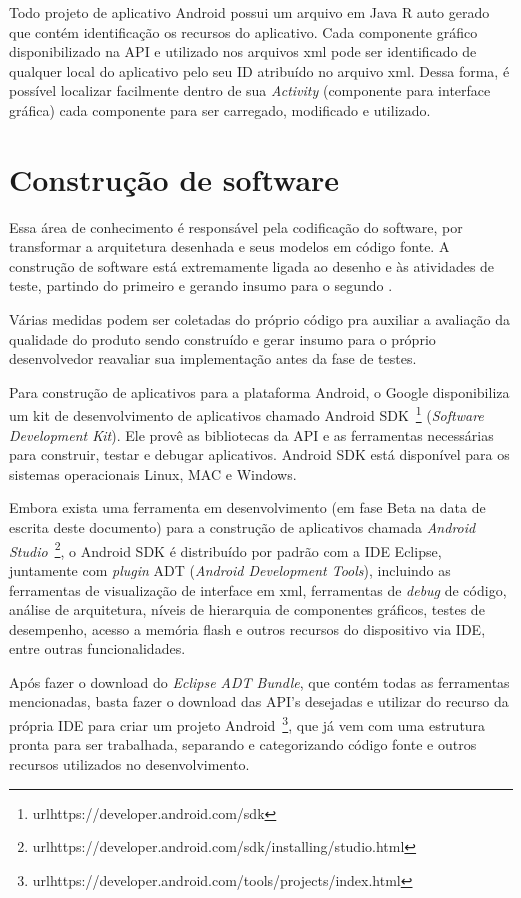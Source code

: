 Todo projeto de aplicativo Android possui um arquivo em Java R auto gerado que contém identificação os recursos do aplicativo. Cada componente gráfico disponibilizado na API e utilizado nos arquivos xml pode ser identificado de qualquer local do aplicativo pelo seu ID atribuído no arquivo xml. Dessa forma, é possível localizar facilmente dentro de sua \textit{Activity} (componente para interface gráfica) cada componente para ser carregado, modificado e utilizado.

\section{Construção de software}

Essa área de conhecimento é responsável pela codificação do software, por transformar a arquitetura desenhada e seus modelos em código fonte. A construção de software está extremamente ligada ao desenho e às atividades de teste, partindo do primeiro e gerando insumo para o segundo \cite{swebok}.

Várias medidas podem ser coletadas do próprio código pra auxiliar a avaliação da qualidade do produto sendo construído e gerar insumo para o próprio desenvolvedor reavaliar sua implementação antes da fase de testes.

Para construção de aplicativos para a plataforma Android, o Google disponibiliza um kit de desenvolvimento de aplicativos chamado Android SDK~\footnote{url{https://developer.android.com/sdk}} (\textit{Software Development Kit}). Ele provê as bibliotecas da API e as ferramentas necessárias para construir, testar e debugar aplicativos. Android SDK está disponível para os sistemas operacionais Linux, MAC e Windows.

Embora exista uma ferramenta em desenvolvimento (em fase Beta na data de escrita deste documento) para a construção de aplicativos chamada \textit{Android Studio}~\footnote{url{https://developer.android.com/sdk/installing/studio.html}}, o Android SDK é distribuído por padrão com a IDE Eclipse, juntamente com \textit{plugin} ADT (\textit{Android Development Tools}), incluindo as ferramentas de visualização de interface em xml, ferramentas de \textit{debug} de código, análise de arquitetura, níveis de hierarquia de componentes gráficos, testes de desempenho, acesso a memória flash e outros recursos do dispositivo via IDE, entre outras funcionalidades.

Após fazer o download do \textit{Eclipse ADT Bundle}, que contém todas as ferramentas mencionadas, basta fazer o download das API's desejadas e utilizar do recurso da própria IDE para criar um projeto Android~\footnote{url{https://developer.android.com/tools/projects/index.html}}, que já vem com uma estrutura pronta para ser trabalhada, separando e categorizando código fonte e outros recursos utilizados no desenvolvimento.

